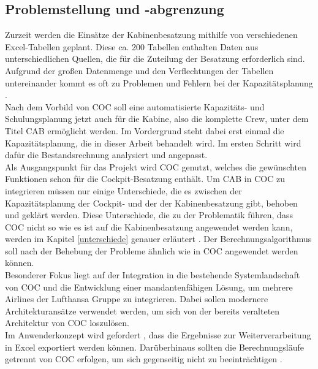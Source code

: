\documentclass [12pt, a4paper, oneside, titlepage, ngerman]{article}
\begin{document}
\subsection {Problemstellung und -abgrenzung}
Zurzeit werden die Einsätze der Kabinenbesatzung mithilfe von verschiedenen Excel-Tabellen geplant. Diese ca. 200 Tabellen enthalten Daten aus unterschiedlichen Quellen, die für die Zuteilung der Besatzung erforderlich sind. Aufgrund der großen Datenmenge und den Verflechtungen der Tabellen untereinander kommt es oft zu Problemen und Fehlern bei der Kapazitätsplanung \cite[vgl.][]{Gespraech2}. \\ 

\noindent Nach dem Vorbild von \ac{COC} soll eine automatisierte Kapazitäts- und Schulungsplanung jetzt auch für die Kabine, also die komplette Crew, unter dem Titel \ac{CAB} ermöglicht werden. Im Vordergrund steht dabei erst einmal die Kapazitätsplanung, die in dieser Arbeit behandelt wird. Im ersten Schritt wird dafür die Bestandsrechnung analysiert und angepasst.\\ %
Als Ausgangspunkt für das Projekt wird \ac{COC} genutzt, welches die gewünschten Funktionen schon für die Cockpit-Besatzung enthält. Um \ac{CAB} in \ac{COC} zu integrieren müssen nur einige Unterschiede, die es zwischen der Kapazitätsplanung der Cockpit- und der der Kabinenbesatzung gibt, behoben und geklärt werden. Diese Unterschiede, die zu der Problematik führen, dass \ac{COC} nicht so wie es ist auf die Kabinenbesatzung angewendet werden kann, werden im Kapitel \ref{unterschiede} genauer erläutert . Der Berechnungsalgorithmus soll nach der Behebung der Probleme ähnlich wie in \ac{COC} angewendet werden können. \\

\noindent Besonderer Fokus liegt auf der Integration in die bestehende Systemlandschaft von \ac{COC} und die Entwicklung einer mandantenfähigen Lösung, um mehrere Airlines der Lufthansa Gruppe zu integrieren. Dabei sollen modernere Architekturansätze verwendet werden, um sich von der bereits veralteten Architektur von \ac{COC} loszulösen. \\
Im Anwenderkonzept wird gefordert , dass die Ergebnisse zur Weiterverarbeitung in Excel exportiert werden können. Darüberhinaus sollten die Berechnungsläufe getrennt von \ac{COC} erfolgen, um sich gegenseitig nicht zu beeinträchtigen \cite[vgl. dazu][]{anwenderkonzept}.
\end{document}
